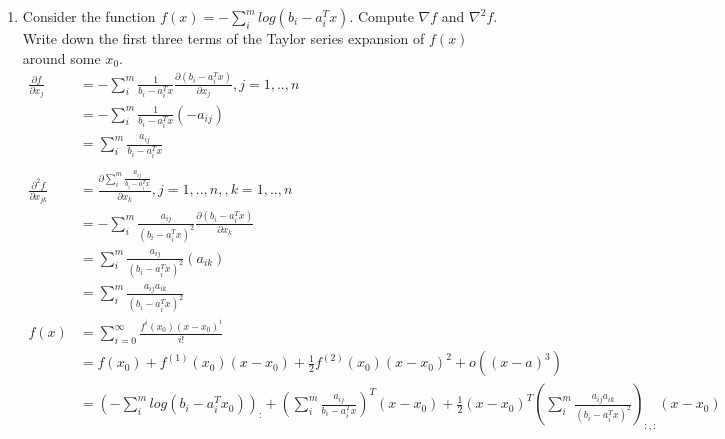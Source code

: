 \documentclass[12pt,letter]{article}
\newcommand{\ppartial}[2]{\frac{\partial #1}{\partial #2}}
\begin{document}


\begin{enumerate}
\item Consider the function $f(x)=-\sum_i^m log(b_i-a_i^Tx)$. Compute $\nabla f$ and $\nabla^2 f$. Write down the first three terms of the Taylor series expansion of $f(x)$ around some $x_0$.\\
  \begin{align*}
    \ppartial{f}{x_j} &= -\sum_i^m \frac{1}{b_i-a_i^T x} \ppartial{(b_i-a_i^Tx)}{x_j}, j=1,..,n\\
                      &= -\sum_i^m \frac{1}{b_i-a_i^T x} (-a_{ij})\\
                      &= \sum_i^m \frac{a_{ij}}{b_i-a_i^T x}\\
    \\
    \ppartial{^2 f}{x_{jk}} &= \ppartial{\sum_i^m \frac{a_{ij}}{b_i-a_i^T x}}{x_k}, j=1,..,n, , k=1,..,n\\
                      &= -\sum_i^m \frac{a_{ij}}{(b_i-a_i^T x)^2}\ppartial{(b_i-a_i^T x)}{x_k}\\
                      &= \sum_i^m \frac{a_{ij}}{(b_i-a_i^T x)^2}(a_{ik})\\
                      &= \sum_i^m \frac{a_{ij}a_{ik}}{(b_i-a_i^T x)^2}\\
    f(x) &= \sum_{i=0}^{\infty} \frac{f^i(x_0)(x-x_0)^i}{i!}\\
                      &=f(x_0)+f^{(1)}(x_0)(x-x_0)+\frac{1}{2}f^{(2)}(x_0)(x-x_0)^2+o((x-a)^3)\\
                      &=(-\sum_i^m log(b_i-a_i^Tx_0))_:+
    (\sum_i^m \frac{a_{ij}}{b_i-a_i^T x})^T (x-x_0)+
    \frac{1}{2} (x-x_0)^T (\sum_i^m \frac{a_{ij}a_{ik}}{(b_i-a_i^T x)^2})_{:,:} (x-x_0)\\
    \\
  \end{align*}
  
  \pagebreak
  

\end{enumerate}
\end{document}
